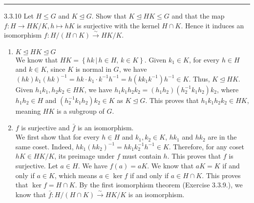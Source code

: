 \documentclass[a4paper, 12pt]{article}
\begin{document}
\noindent\rule{7in}{2.8pt}
\begin{problem}{3.3.10}
Let \(H\leq G\) and \(K\unlhd G\). Show that \(K\unlhd HK\leq G\) and that the map \(f:H\rightarrow HK/K,h\mapsto hK\) is surjective with the kernel \(H\cap K\). Hence it 
induces an isomorphism \(f:H/(H\cap K)\xrightarrow{\sim}HK/K\).
\end{problem}
\begin{solution}
\begin{enumerate}
\item \(K\unlhd HK\unlhd G\)\\ 
We know that \(HK=\left\{ hk\, |\, h\in H,\, k\in K\right\}\). Given \(k_1\in K\), for every \(h\in H\) and \(k\in K\), since \(K\) is normal in \(G\), we have \((hk)k_1(hk)^{-1}=hk\cdot k_1\cdot k^{-1}h^{-1}=h(kk_1k^{-1})h^{-1}\in K\). Thus, 
\(K\unlhd HK\). Given \(h_1k_1,h_2k_2\in HK\), we have \(h_1k_1h_2k_2=(h_1h_2)(h_2^{-1}k_1h_2)k_2\), where \(h_1h_2\in H\) and \((h_2^{-1}k_1h_2)k_2\in K\) as \(K\unlhd G\). This proves that \(h_1k_1h_2k_2\in HK\), meaning \(HK\) is a subgroup of \(G\). 
\item \(f\) is surjective and \(\bar{f}\) is an isomorphism.\\ 
We first show that for every \(h\in H\) and \(k_1,k_2\in K\), \(hk_1\) and \(hk_2\) are in the same coset. Indeed, \(hk_1(hk_2)^{-1}=hk_1k_2^{-1}h^{-1}\in K\). Therefore, for any coset \(hK\in HK/K\), its preimage under \(f\) must contain \(h\). This proves that 
\(f\) is surjective. Let \(a\in H\). We have \(f(a)=aK\). We know that \(aK=K\) if and only if \(a\in K\), which means \(a\in \ker f\) if and only if \(a\in H\cap K\). This proves that \(\ker f=H\cap K\). By the first isomorphism theorem (Exercise 3.3.9.), we know that 
\(\bar{f}:H/(H\cap K)\xrightarrow{\sim} HK/K\) is an isomorphism.
\end{enumerate}
\end{solution}
\end{document}
